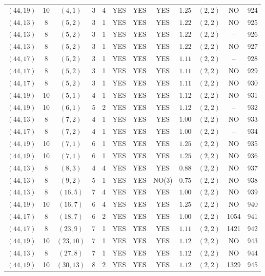 \begin{longtable}{|c|c|c|c|c|c|c|c|c|c|c|c|}
$(44,19)$ & 10 & $(4,1)$ & 3 & 4 & YES & YES & YES & $1.25$ & $(2,2)$ & NO & 924\\
$(44,13)$ & 8 & $(5,2)$ & 3 & 1 & YES & YES & YES & $1.22$ & $(2,2)$ & NO & 925\\
$(44,13)$ & 8 & $(5,2)$ & 3 & 1 & YES & YES & YES & $1.22$ & $(2,2)$ & -- & 926\\
$(44,13)$ & 8 & $(5,2)$ & 3 & 1 & YES & YES & YES & $1.22$ & $(2,2)$ & NO & 927\\
$(44,17)$ & 8 & $(5,2)$ & 3 & 1 & YES & YES & YES & $1.11$ & $(2,2)$ & -- & 928\\
$(44,17)$ & 8 & $(5,2)$ & 3 & 1 & YES & YES & YES & $1.11$ & $(2,2)$ & NO & 929\\
$(44,17)$ & 8 & $(5,2)$ & 3 & 1 & YES & YES & YES & $1.11$ & $(2,2)$ & NO & 930\\
$(44,19)$ & 10 & $(5,1)$ & 4 & 1 & YES & YES & YES & $1.12$ & $(2,2)$ & NO & 931\\
$(44,19)$ & 10 & $(6,1)$ & 5 & 2 & YES & YES & YES & $1.12$ & $(2,2)$ & -- & 932\\
$(44,13)$ & 8 & $(7,2)$ & 4 & 1 & YES & YES & YES & $1.00$ & $(2,2)$ & NO & 933\\
$(44,17)$ & 8 & $(7,2)$ & 4 & 1 & YES & YES & YES & $1.00$ & $(2,2)$ & -- & 934\\
$(44,19)$ & 10 & $(7,1)$ & 6 & 1 & YES & YES & YES & $1.25$ & $(2,2)$ & NO & 935\\
$(44,19)$ & 10 & $(7,1)$ & 6 & 1 & YES & YES & YES & $1.25$ & $(2,2)$ & NO & 936\\
$(44,13)$ & 8 & $(8,3)$ & 4 & 4 & YES & YES & YES & $0.88$ & $(2,2)$ & NO & 937\\
$(44,13)$ & 8 & $(9,2)$ & 5 & 1 & YES & YES & NO(3) & $0.75$ & $(2,2)$ & NO & 938\\
$(44,13)$ & 8 & $(16,5)$ & 7 & 4 & YES & YES & YES & $1.00$ & $(2,2)$ & NO & 939\\
$(44,19)$ & 10 & $(16,7)$ & 6 & 4 & YES & YES & YES & $1.25$ & $(2,2)$ & NO & 940\\
$(44,17)$ & 8 & $(18,7)$ & 6 & 2 & YES & YES & YES & $1.00$ & $(2,2)$ & 1054 & 941\\
$(44,17)$ & 8 & $(23,9)$ & 7 & 1 & YES & YES & YES & $1.11$ & $(2,2)$ & 1421 & 942\\
$(44,19)$ & 10 & $(23,10)$ & 7 & 1 & YES & YES & YES & $1.12$ & $(2,2)$ & NO & 943\\
$(44,13)$ & 8 & $(27,8)$ & 7 & 1 & YES & YES & YES & $1.12$ & $(2,2)$ & NO & 944\\
$(44,19)$ & 10 & $(30,13)$ & 8 & 2 & YES & YES & YES & $1.12$ & $(2,2)$ & 1329 & 945\\

\end{longtable}

